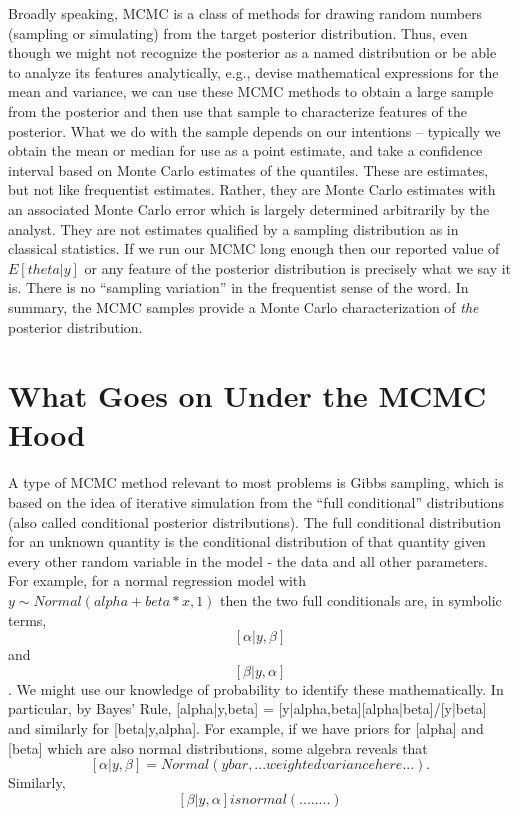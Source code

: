 Broadly speaking, MCMC is a class of methods for drawing random numbers (sampling or simulating) from the target posterior distribution.  Thus, even though we might not recognize the posterior as a named distribution or be able to analyze its features analytically, e.g., devise mathematical expressions for the mean and variance, we can use these MCMC methods to obtain a large sample from the posterior and then use that sample to characterize features of the posterior. What we do with the sample depends on our intentions -- typically we obtain the mean or median for use as a point estimate, and take a confidence interval based on Monte Carlo estimates of the quantiles.  These are estimates, but not like frequentist estimates. Rather, they are Monte Carlo estimates with an associated Monte Carlo error which is largely determined arbitrarily by the analyst. They are not estimates qualified by a sampling distribution as in classical statistics. If we run our MCMC long enough then our reported value of $E[theta|y]$ or any feature of the posterior distribution is precisely what we say it is. There is no ``sampling variation'' in the frequentist sense of the word.  In summary, the MCMC samples provide a Monte Carlo characterization of {\it the} posterior distribution.


\section{What Goes on Under the MCMC Hood}

A type of MCMC method relevant to most problems is Gibbs sampling, which is based on the idea of iterative simulation from the ``full conditional'' distributions (also called conditional posterior distributions). The full conditional distribution for an unknown quantity is the conditional distribution of that quantity given every other random variable in the model - the data and all other parameters. For example, for a normal regression model with $y \sim Normal(alpha + beta*x , 1)$ then the two full conditionals are, in symbolic terms,
\[ 
[\alpha|y,\beta]
\]
 and 
\[
[\beta|y,\alpha]
\]. 
We might use our knowledge of probability to identify these mathematically. In particular, by Bayes' Rule, [alpha|y,beta] = [y|alpha,beta][alpha|beta]/[y|beta] and similarly for [beta|y,alpha]. For example, if we have priors for [alpha] and [beta] which are also normal distributions, some algebra reveals that 
\[
[\alpha|y,\beta] = Normal(ybar,...weighted variance here...). 
\]
Similarly,
\[
 [\beta|y,\alpha] is normal(........) 
\]

